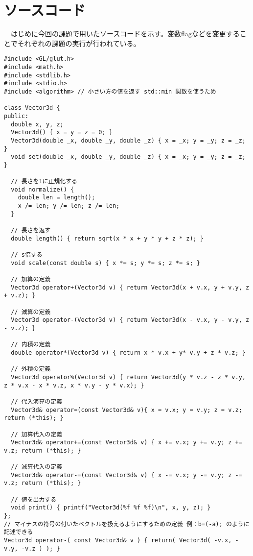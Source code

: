 \documentclass{scrartcl}
\begin{document}
\section{ソースコード}
\label{sec:org3c74b9a}
　はじめに今回の課題で用いたソースコードを示す。変数flagなどを変更することでそれぞれの課題の実行が行われている。\\
\begin{verbatim}
#include <GL/glut.h>
#include <math.h>
#include <stdlib.h>
#include <stdio.h>
#include <algorithm> // 小さい方の値を返す std::min 関数を使うため

class Vector3d {
public:
  double x, y, z;
  Vector3d() { x = y = z = 0; }
  Vector3d(double _x, double _y, double _z) { x = _x; y = _y; z = _z; }
  void set(double _x, double _y, double _z) { x = _x; y = _y; z = _z; }

  // 長さを1に正規化する
  void normalize() {
    double len = length();
    x /= len; y /= len; z /= len;
  }

  // 長さを返す
  double length() { return sqrt(x * x + y * y + z * z); }

  // s倍する
  void scale(const double s) { x *= s; y *= s; z *= s; }

  // 加算の定義
  Vector3d operator+(Vector3d v) { return Vector3d(x + v.x, y + v.y, z + v.z); }

  // 減算の定義
  Vector3d operator-(Vector3d v) { return Vector3d(x - v.x, y - v.y, z - v.z); }

  // 内積の定義
  double operator*(Vector3d v) { return x * v.x + y* v.y + z * v.z; }

  // 外積の定義
  Vector3d operator%(Vector3d v) { return Vector3d(y * v.z - z * v.y, z * v.x - x * v.z, x * v.y - y * v.x); }

  // 代入演算の定義
  Vector3d& operator=(const Vector3d& v){ x = v.x; y = v.y; z = v.z; return (*this); }

  // 加算代入の定義
  Vector3d& operator+=(const Vector3d& v) { x += v.x; y += v.y; z += v.z; return (*this); }

  // 減算代入の定義
  Vector3d& operator-=(const Vector3d& v) { x -= v.x; y -= v.y; z -= v.z; return (*this); }

  // 値を出力する
  void print() { printf("Vector3d(%f %f %f)\n", x, y, z); }
};
// マイナスの符号の付いたベクトルを扱えるようにするための定義 例：b=(-a); のように記述できる
Vector3d operator-( const Vector3d& v ) { return( Vector3d( -v.x, -v.y, -v.z ) ); }


\end{verbatim}
\end{document}
